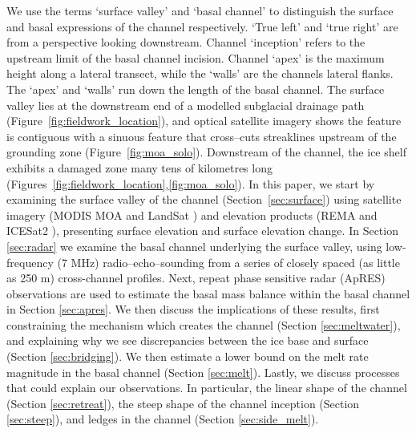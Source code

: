 We use the terms `surface valley' and `basal channel' to distinguish the surface and basal expressions of the channel respectively. `True left' and `true right' are from a perspective looking downstream. Channel `inception' refers to the upstream limit of the basal channel incision. Channel `apex' is the maximum height along a lateral transect, while the `walls' are the channels lateral flanks. The `apex' and `walls' run down the length of the basal channel.  The surface valley lies at the downstream end of a modelled subglacial drainage path (Figure~\ref{fig:fieldwork_location}), and optical satellite imagery shows the feature is contiguous with a sinuous feature that cross--cuts streaklines upstream of the grounding zone (Figure~\ref{fig:moa_solo}). Downstream of the channel, the ice shelf exhibits a damaged zone many tens of kilometres long (Figures~\ref{fig:fieldwork_location},\ref{fig:moa_solo}).
In this paper, we start by examining the surface valley of the channel (Section~\ref{sec:surface}) using satellite imagery (MODIS MOA \cite{haran2014modis} and LandSat \cite{RoyLandsat8Scienceproduct2014}) and elevation products (REMA \cite{howat2019reference} and ICESat2 \cite{smith2021v3}), presenting surface elevation and surface elevation change. 
In Section \ref{sec:radar} we examine the basal channel underlying the surface valley, using low-frequency (7 MHz) radio--echo--sounding from a series of closely spaced (as little as 250 m) cross-channel profiles. Next, repeat phase sensitive radar (ApRES) observations are used to estimate the basal mass balance within the basal channel in Section \ref{sec:apres}.
We then discuss the implications of these results, first constraining the mechanism which creates the channel (Section \ref{sec:meltwater}), and explaining why we see discrepancies between the ice base and surface (Section \ref{sec:bridging}). We then estimate a lower bound on the melt rate magnitude in the basal channel (Section \ref{sec:melt}). 
Lastly, we discuss processes that could explain our observations. In particular, the linear shape of the channel (Section \ref{sec:retreat}), the steep shape of the channel inception (Section \ref{sec:steep}), and ledges in the channel (Section \ref{sec:side_melt}).

